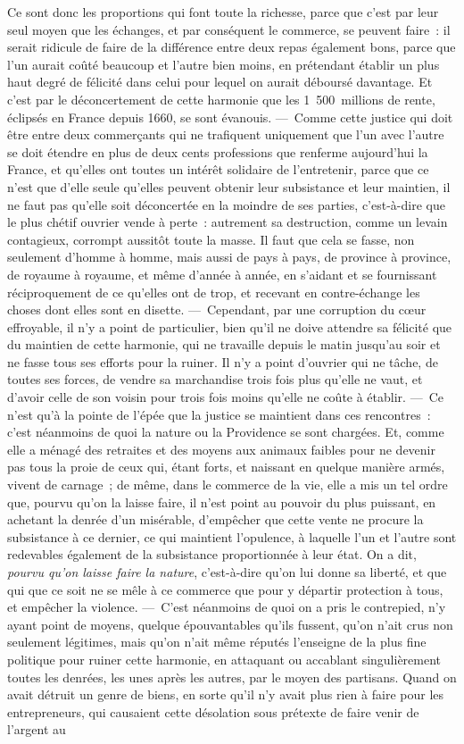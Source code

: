 \documentclass[french,twoside]{book} %
\begin{document}
Ce sont donc les proportions qui font toute la richesse, parce que c’est par leur seul moyen que les échanges, et par conséquent le commerce, se peuvent faire : il serait ridicule de faire de la différence entre deux repas également bons, parce que l’un aurait coûté beaucoup et l’autre bien moins, en prétendant établir un plus haut degré de félicité dans celui pour lequel on aurait déboursé davantage. Et c’est par le déconcertement de cette harmonie que les 1 500 millions de rente, éclipsés en France depuis 1660, se sont évanouis. — Comme cette justice qui doit être entre deux commerçants qui ne trafiquent uniquement que l’un avec l’autre se doit étendre en plus de deux cents professions que renferme aujourd’hui la France, et qu’elles ont toutes un intérêt solidaire de l’entretenir, parce que ce n’est que d’elle seule qu’elles peuvent obtenir leur subsistance et leur maintien, il ne faut pas qu’elle soit déconcertée en la moindre de ses parties, c’est-à-dire que le plus chétif ouvrier vende à perte : autrement sa destruction, comme un levain contagieux, corrompt aussitôt toute la masse. Il faut que cela se fasse, non seulement d’homme à homme, mais aussi de pays à pays, de province à province, de royaume à royaume, et même d’année à année, en s’aidant et se fournissant réciproquement de ce qu’elles ont de trop, et recevant en contre-échange les choses dont elles sont en disette. — Cependant, par une corruption du cœur effroyable, il n’y a point de particulier, bien qu’il ne doive attendre sa félicité que du maintien de cette harmonie, qui ne travaille depuis le matin jusqu’au soir et ne fasse tous ses efforts pour la ruiner. Il n’y a point d’ouvrier qui ne tâche, de toutes ses forces, de vendre sa marchandise trois fois plus qu’elle ne vaut, et d’avoir celle de son voisin pour trois fois moins qu’elle ne coûte à établir. — Ce n’est qu’à la pointe de l’épée que la justice se maintient dans ces rencontres : c’est néanmoins de quoi la nature ou la Providence se sont chargées. Et, comme elle a ménagé des retraites et des moyens aux animaux faibles pour ne devenir pas tous la proie de ceux qui, étant forts, et naissant en quelque manière armés, vivent de carnage ; de même, dans le commerce de la vie, elle a mis un tel ordre que, pourvu qu’on la laisse faire, il n’est point au pouvoir du plus puissant, en achetant la denrée d’un misérable, d’empêcher que cette vente ne procure la subsistance à ce dernier, ce qui maintient l’opulence, à laquelle l’un et l’autre sont redevables également de la subsistance proportionnée à leur état. On a dit, {\itshape pourvu qu’on laisse faire la nature}, c’est-à-dire qu’on lui donne sa liberté, et que qui que ce soit ne se mêle à ce commerce que pour y départir protection à tous, et empêcher la violence. — C’est néanmoins de quoi on a pris le contrepied, n’y ayant point de moyens, quelque épouvantables qu’ils fussent, qu’on n’ait crus non seulement légitimes, mais qu’on n’ait même réputés l’enseigne de la plus fine politique pour ruiner cette harmonie, en attaquant ou accablant singulièrement toutes les denrées, les unes après les autres, par le moyen des partisans. Quand on avait détruit un genre de biens, en sorte qu’il n’y avait plus rien à faire pour les entrepreneurs, qui causaient cette désolation sous prétexte de faire venir de l’argent au 
\end{document}
